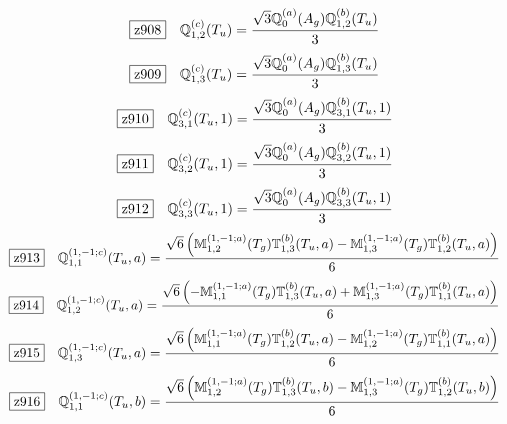 \documentclass[fleqn,10pt,landscape]{jsarticle}
\begin{document}
\begin{dmath*}
\hspace*{3mm}\fbox{z908}\quad \mathbb{Q}_{1,2}^{(c)}(T_{u})=\frac{\sqrt{3} \mathbb{Q}_{0}^{(a)}(A_{g}) \mathbb{Q}_{1,2}^{(b)}(T_{u})}{3}
\end{dmath*}
\begin{dmath*}
\hspace*{3mm}\fbox{z909}\quad \mathbb{Q}_{1,3}^{(c)}(T_{u})=\frac{\sqrt{3} \mathbb{Q}_{0}^{(a)}(A_{g}) \mathbb{Q}_{1,3}^{(b)}(T_{u})}{3}
\end{dmath*}
\begin{dmath*}
\hspace*{3mm}\fbox{z910}\quad \mathbb{Q}_{3,1}^{(c)}(T_{u},1)=\frac{\sqrt{3} \mathbb{Q}_{0}^{(a)}(A_{g}) \mathbb{Q}_{3,1}^{(b)}(T_{u},1)}{3}
\end{dmath*}
\begin{dmath*}
\hspace*{3mm}\fbox{z911}\quad \mathbb{Q}_{3,2}^{(c)}(T_{u},1)=\frac{\sqrt{3} \mathbb{Q}_{0}^{(a)}(A_{g}) \mathbb{Q}_{3,2}^{(b)}(T_{u},1)}{3}
\end{dmath*}
\begin{dmath*}
\hspace*{3mm}\fbox{z912}\quad \mathbb{Q}_{3,3}^{(c)}(T_{u},1)=\frac{\sqrt{3} \mathbb{Q}_{0}^{(a)}(A_{g}) \mathbb{Q}_{3,3}^{(b)}(T_{u},1)}{3}
\end{dmath*}
\begin{dmath*}
\hspace*{3mm}\fbox{z913}\quad \mathbb{Q}_{1,1}^{(1,-1;c)}(T_{u},a)=\frac{\sqrt{6} \left(\mathbb{M}_{1,2}^{(1,-1;a)}(T_{g}) \mathbb{T}_{1,3}^{(b)}(T_{u},a) - \mathbb{M}_{1,3}^{(1,-1;a)}(T_{g}) \mathbb{T}_{1,2}^{(b)}(T_{u},a)\right)}{6}
\end{dmath*}
\begin{dmath*}
\hspace*{3mm}\fbox{z914}\quad \mathbb{Q}_{1,2}^{(1,-1;c)}(T_{u},a)=\frac{\sqrt{6} \left(- \mathbb{M}_{1,1}^{(1,-1;a)}(T_{g}) \mathbb{T}_{1,3}^{(b)}(T_{u},a) + \mathbb{M}_{1,3}^{(1,-1;a)}(T_{g}) \mathbb{T}_{1,1}^{(b)}(T_{u},a)\right)}{6}
\end{dmath*}
\begin{dmath*}
\hspace*{3mm}\fbox{z915}\quad \mathbb{Q}_{1,3}^{(1,-1;c)}(T_{u},a)=\frac{\sqrt{6} \left(\mathbb{M}_{1,1}^{(1,-1;a)}(T_{g}) \mathbb{T}_{1,2}^{(b)}(T_{u},a) - \mathbb{M}_{1,2}^{(1,-1;a)}(T_{g}) \mathbb{T}_{1,1}^{(b)}(T_{u},a)\right)}{6}
\end{dmath*}
\begin{dmath*}
\hspace*{3mm}\fbox{z916}\quad \mathbb{Q}_{1,1}^{(1,-1;c)}(T_{u},b)=\frac{\sqrt{6} \left(\mathbb{M}_{1,2}^{(1,-1;a)}(T_{g}) \mathbb{T}_{1,3}^{(b)}(T_{u},b) - \mathbb{M}_{1,3}^{(1,-1;a)}(T_{g}) \mathbb{T}_{1,2}^{(b)}(T_{u},b)\right)}{6}
\end{dmath*}
\end{document}
